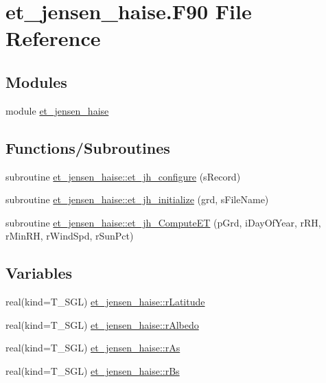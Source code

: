 \hypertarget{et__jensen__haise_8_f90}{
\section{et\_\-jensen\_\-haise.F90 File Reference}
\label{et__jensen__haise_8_f90}
}
\subsection*{Modules}
\begin{DoxyCompactItemize}
\item 
module \hyperlink{namespaceet__jensen__haise}{et\_\-jensen\_\-haise}
\end{DoxyCompactItemize}
\subsection*{Functions/Subroutines}
\begin{DoxyCompactItemize}
\item 
subroutine \hyperlink{namespaceet__jensen__haise_a4ac0f95d0defb2e2b4f69823a875100e}{et\_\-jensen\_\-haise::et\_\-jh\_\-configure} (sRecord)
\item 
subroutine \hyperlink{namespaceet__jensen__haise_a0c56e8c8b7ba75e1e5bd834699ee5e1f}{et\_\-jensen\_\-haise::et\_\-jh\_\-initialize} (grd, sFileName)
\item 
subroutine \hyperlink{namespaceet__jensen__haise_a5bea6db1809c509d28b93ea3d1f8181e}{et\_\-jensen\_\-haise::et\_\-jh\_\-ComputeET} (pGrd, iDayOfYear, rRH, rMinRH, rWindSpd, rSunPct)
\end{DoxyCompactItemize}
\subsection*{Variables}
\begin{DoxyCompactItemize}
\item 
real(kind=T\_\-SGL) \hyperlink{namespaceet__jensen__haise_af549b1e8ee92983a6b3eddf4c927efcf}{et\_\-jensen\_\-haise::rLatitude}
\item 
real(kind=T\_\-SGL) \hyperlink{namespaceet__jensen__haise_a81532a18aa4ad4afc0670a30833834ac}{et\_\-jensen\_\-haise::rAlbedo}
\item 
real(kind=T\_\-SGL) \hyperlink{namespaceet__jensen__haise_acfcbd3abba7d349d3eaf3ab277d4428e}{et\_\-jensen\_\-haise::rAs}
\item 
real(kind=T\_\-SGL) \hyperlink{namespaceet__jensen__haise_a90836da6e648069d180faaf8d9f66a0e}{et\_\-jensen\_\-haise::rBs}
\end{DoxyCompactItemize}
